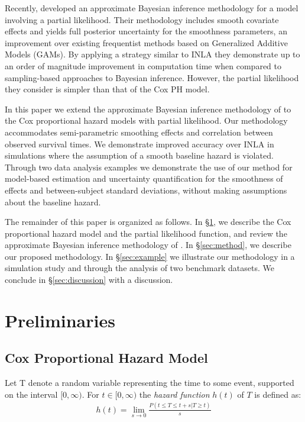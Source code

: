 \documentclass[]{article}
\begin{document}
Recently, \citet{casecross} developed an approximate Bayesian inference methodology for a model involving a partial likelihood. Their methodology includes smooth covariate effects and yields full posterior uncertainty for the smoothness parameters, an improvement over existing frequentist methods based on Generalized Additive Models (GAMs). By applying a strategy similar to INLA they demonstrate up to an order of magnitude improvement in computation time when compared to sampling-based approaches to Bayesian inference. However, the partial likelihood they consider is simpler than that of the Cox PH model.

In this paper we extend the approximate Bayesian inference methodology of \citet{casecross} to the Cox proportional hazard models with partial likelihood. Our methodology accommodates semi-parametric smoothing effects and correlation between observed survival times. We demonstrate improved accuracy over INLA in simulations where the assumption of a smooth baseline hazard is violated. Through two data analysis examples we demonstrate the use of our method for model-based estimation and uncertainty quantification for the smoothness of effects and between-subject standard deviations, without making assumptions about the baseline hazard.

The remainder of this paper is organized as follows. In \S\ref{sec:prelim}, we describe the Cox proportional hazard model and the partial likelihood function, and review the approximate Bayesian inference methodology of \citet{casecross}. In \S\ref{sec:method}, we describe our proposed methodology. In \S\ref{sec:example} we illustrate our methodology in a simulation study and through the analysis of two benchmark datasets. We conclude in \S\ref{sec:discussion} with a discussion.



\section{Preliminaries}\label{sec:prelim}
\subsection{Cox Proportional Hazard Model}
Let T denote a random variable representing the time to some event, supported on the interval $[0,\infty)$. For $t\in[0,\infty)$ the \textit{hazard function} $h(t)$ of $T$ is defined as:
\begin{equation}\begin{aligned}\label{eqn:hazard}
h(t) = \lim_{s\to 0} \frac{P(t\le T \le t+s |T\ge t)}{s}
\end{aligned}\end{equation}
\end{document}
